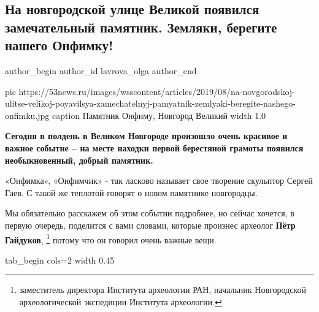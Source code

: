  
 
 
 
 
 
\subsection{На новгородской улице Великой появился замечательный памятник. Земляки, берегите нашего Онфимку!}
\label{sec:23_08_2019.news.ru.53news.lavrova_olga.1.novgorod_onfimka_pamjatnik}
\ifcmt
	author_begin
   author_id lavrova_olga
	author_end
\fi


\ifcmt
pic https://53news.ru/images/wsscontent/articles/2019/08/na-novgorodskoj-ulitse-velikoj-poyavilsya-zamechatelnyj-pamyatnik-zemlyaki-beregite-nashego-onfimku.jpg
caption Памятник Онфиму, Новгород Великий
width 1.0
\fi

\textbf{Сегодня в полдень в Великом Новгороде произошло очень красивое и важное событие
– на месте находки первой берестяной грамоты появился необыкновенный, добрый
памятник.} 

«Онфимка», «Онфимчик» - так ласково называет свое творение скульптор Сергей
Гаев. С такой же теплотой говорят о новом памятнике новгородцы.

Мы обязательно расскажем об этом событии подробнее, но сейчас хочется, в первую
очередь, поделится с вами словами, которые произнес археолог \textbf{Пётр Гайдуков},
\footnote{заместитель директора Института археологии РАН, начальник Новгородской археологической экспедиции Института археологии.}
потому что он говорил очень важные вещи. 

\ifcmt
tab_begin cols=2
  width 0.45


